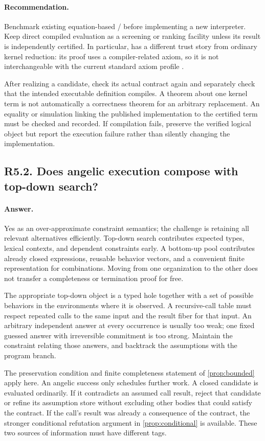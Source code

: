 \documentclass[11pt,a4paper]{article}
\newcommand{\code}[1]{\texttt{\detokenize{#1}}}
\newcommand{\answer}{\paragraph{Answer.}}
\newcommand{\recommend}{\paragraph{Recommendation.}}
\theoremstyle{definition}
\theoremstyle{remark}
\begin{document}
\recommend Benchmark existing equation-based \code{cbv}/\code{decide_cbv}
before implementing a new interpreter. Keep direct compiled evaluation as a
screening or ranking facility unless its result is independently certified.
In particular, \code{native_decide} has a different trust story from ordinary
kernel reduction: its proof uses a compiler-related axiom, so it is not
interchangeable with the current standard axiom profile
\cite{leancbv,leantactics,repo}.

After realizing a candidate, check its actual contract again and separately
check that the intended executable definition compiles. A theorem about one
kernel term is not automatically a correctness theorem for an arbitrary
\code{implemented_by} replacement. An equality or simulation linking the
published implementation to the certified term must be checked and recorded.
If compilation fails, preserve the verified logical object but report the
execution failure rather than silently changing the implementation.

\subsection{R5.2. Does angelic execution compose with top-down search?}
\answer Yes as an over-approximate constraint semantics; the challenge is retaining
all relevant alternatives efficiently. Top-down search contributes expected
types, lexical contexts, and dependent constraints early. A bottom-up pool
contributes already closed expressions, reusable behavior vectors, and a
convenient finite representation for combinations. Moving from one organization
to the other does not transfer a completeness or termination proof for free.

The appropriate top-down object is a typed hole together with a set of possible
behaviors in the environments where it is observed. A recursive-call table must
respect repeated calls to the same input and the result fiber for that input.
An arbitrary independent answer at every occurrence is usually too weak; one
fixed guessed answer with irreversible commitment is too strong. Maintain the
constraint relating those answers, and backtrack the assumptions with the
program branch.

The preservation condition and finite completeness statement of
\cref{prop:bounded} apply here. An angelic success only schedules further work.
A closed candidate is evaluated ordinarily. If it contradicts an assumed call
result, reject that candidate or refine its assumption store without excluding
other bodies that could satisfy the contract. If the call's result was already
a consequence of the contract, the stronger conditional refutation argument in
\cref{prop:conditional} is available. These two sources of information must have
different tags.
\end{document}
